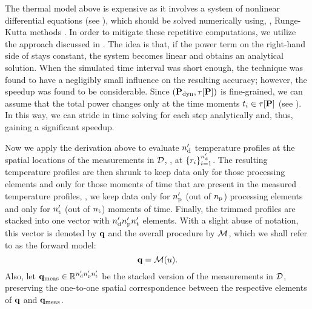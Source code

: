 



The thermal model above is expensive as it involves a system of nonlinear differential equations (see ), which should be solved numerically using, \eg, Runge-Kutta methods \cite{press2007}. In order to mitigate these repetitive computations, we utilize the approach discussed in \cite{ukhov2012}.
The idea is that, if the power term on the right-hand side of  stays constant, the system becomes linear and obtains an analytical solution. When the simulated time interval was short enough, the technique was found to have a negligibly small influence on the resulting accuracy; however, the speedup was found to be considerable.
Since $(\mathbf{P}_{\text{dyn}}, \tau[\mathbf{P}])$ is fine-grained, we can assume that the total power changes only at the time moments $t_i \in \tau[\mathbf{P}]$ (see ). In this way, we can stride in time solving  for each step analytically and, thus, gaining a significant speedup.

Now we apply the derivation above to evaluate ${n_\text{d}'}$ temperature profiles at the spatial locations of the measurements in $\mathcal{D}$, \ie, at $\{ r_i \}_{i = 1}^{n_\text{d}'}$. The resulting temperature profiles are then shrunk to keep data only for those processing elements and only for those moments of time that are present in the measured temperature profiles, \ie, we keep data only for ${n_\text{p}'}$ (out of ${n_\text{p}}$) processing elements and only for ${n_\text{t}'}$ (out of ${n_\text{t}}$) moments of time. Finally, the trimmed profiles are stacked into one vector with ${n_\text{d}'} {n_\text{p}'} {n_\text{t}'}$ elements. With a slight abuse of notation, this vector is denoted by $\mathbf{q}$ and the overall procedure by $\model$, which we shall refer to as the forward model:
\begin{equation} \elabel{model}
  \mvT = \model{\u}.
\end{equation}
Also, let $\mathbf{q}_{\text{meas}} \in \mathbb{R}^{{n_\text{d}'} {n_\text{p}'} {n_\text{t}'}}$ be the stacked version of the measurements in $\mathcal{D}$, preserving the one-to-one spatial correspondence between the respective elements of $\mathbf{q}$ and $\mathbf{q}_{\text{meas}}$.
